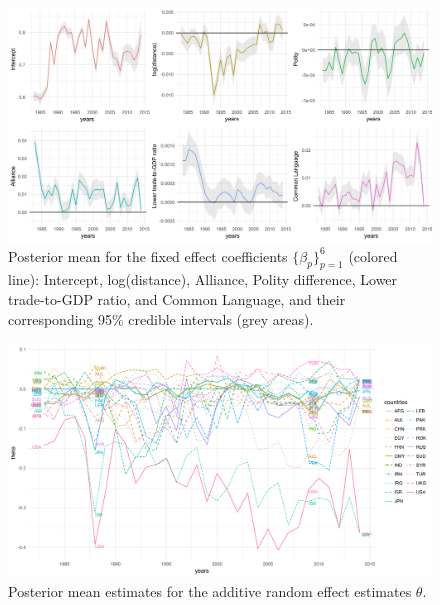 \documentclass[a4paper]{article}
\begin{document}
\begin{figure}[ht]
	\begin{center}
		\includegraphics[width=1\textwidth]{plots_paper/betaplot-1.png}
	\end{center}
	 	\caption {Posterior mean for the fixed effect coefficients $\{\beta_p\}_{p=1}^6$  (colored line): Intercept, log(distance), Alliance, Polity difference, Lower trade-to-GDP ratio, and Common Language, and their corresponding 95\% credible intervals (grey areas). }
	\label{figure:interceptplot}
\end{figure}
 \begin{figure}[ht]
 	\begin{center}
 		\includegraphics[width=1\textwidth]{plots_paper/thetaplot-1.png}	
 	\end{center}
 	\caption {Posterior mean estimates for the additive random effect estimates $\theta$.}
 	\label{figure:thetaplot}
 \end{figure}
\end{document}
